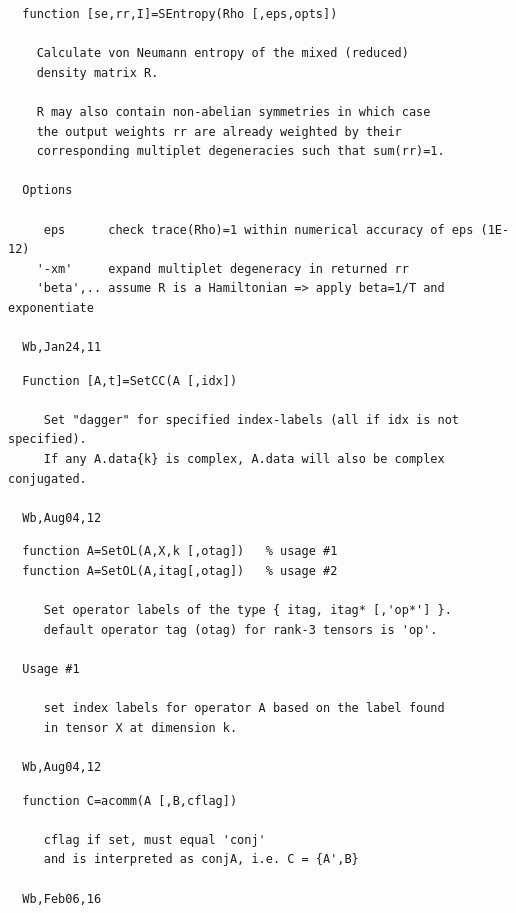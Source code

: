\documentclass[twoside,12pt]{article}
\begin{document}
\pagebreak[3]



\begin{verbatim}
  function [se,rr,I]=SEntropy(Rho [,eps,opts])
 
    Calculate von Neumann entropy of the mixed (reduced)
    density matrix R.
 
    R may also contain non-abelian symmetries in which case
    the output weights rr are already weighted by their 
    corresponding multiplet degeneracies such that sum(rr)=1.
 
  Options
 
     eps      check trace(Rho)=1 within numerical accuracy of eps (1E-12)
    '-xm'     expand multiplet degeneracy in returned rr
    'beta',.. assume R is a Hamiltonian => apply beta=1/T and exponentiate
 
  Wb,Jan24,11
\end{verbatim}

\pagebreak[3]



\begin{verbatim}
  Function [A,t]=SetCC(A [,idx])
 
     Set "dagger" for specified index-labels (all if idx is not specified).
     If any A.data{k} is complex, A.data will also be complex conjugated.
 
  Wb,Aug04,12
\end{verbatim}

\pagebreak[3]



\begin{verbatim}
  function A=SetOL(A,X,k [,otag])   % usage #1
  function A=SetOL(A,itag[,otag])   % usage #2
 
     Set operator labels of the type { itag, itag* [,'op*'] }.
     default operator tag (otag) for rank-3 tensors is 'op'.
 
  Usage #1
 
     set index labels for operator A based on the label found
     in tensor X at dimension k.
 
  Wb,Aug04,12
\end{verbatim}

\pagebreak[3]



\begin{verbatim}
  function C=acomm(A [,B,cflag])
 
     cflag if set, must equal 'conj'
     and is interpreted as conjA, i.e. C = {A',B}
 
  Wb,Feb06,16
\end{verbatim}
\end{document}

